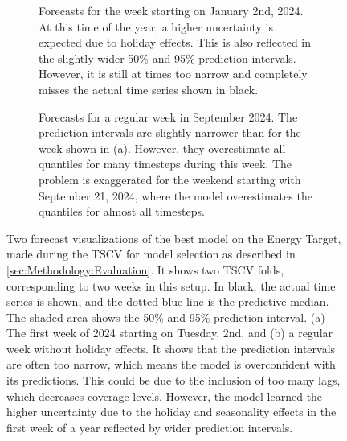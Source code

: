 \begin{figure}[htbp]
    \centering
    \begin{subfigure}[b]{0.95\textwidth}
        \centering
        
        \caption{Forecasts for the week starting on January 2nd, 2024. At this time of the year, a higher uncertainty is expected due to holiday effects. This is also reflected in the slightly wider 50\% and 95\% prediction intervals. However, it is still at times too narrow and completely misses the actual time series shown in black.}
        \label{fig:forecast-plot-1}
    \end{subfigure}
    \begin{subfigure}[b]{0.95\textwidth}
        \centering
        
        \caption{Forecasts for a regular week in September 2024. The prediction intervals are slightly narrower than for the week shown in (a). However, they overestimate all quantiles for many timesteps during this week. The problem is exaggerated for the weekend starting with September 21, 2024, where the model overestimates the quantiles for almost all timesteps.}
        \label{fig:forecast-plot-2}
    \end{subfigure}
    \caption{Two forecast visualizations of the best model on the Energy Target, made during the TSCV for model selection as described in \cref{sec:Methodology:Evaluation}. It shows two TSCV folds, corresponding to two weeks in this setup. In black, the actual time series is shown, and the dotted blue line is the predictive median. The shaded area shows the 50\% and 95\% prediction interval. (a) The first week of 2024 starting on Tuesday, 2nd, and (b) a regular week without holiday effects. It shows that the prediction intervals are often too narrow, which means the model is overconfident with its predictions. This could be due to the inclusion of too many lags, which decreases coverage levels. However, the model learned the higher uncertainty due to the holiday and seasonality effects in the first week of a year reflected by wider prediction intervals.}
    \label{fig:Forecast-visualization}
\end{figure}



